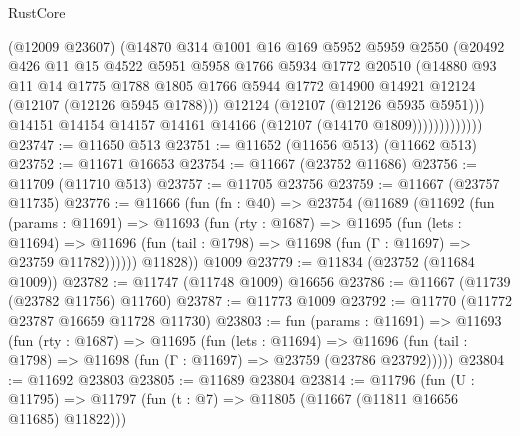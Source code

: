 \begin{lexlean}{RustCore}
\begin{coremodule}
                        (@12009 @23607)
                        (@14870
                          @314
                          @1001
                          @16
                          @169
                          @5952
                          @5959
                          @2550
                          (@20492
                            @426
                            @11
                            @15
                            @4522
                            @5951
                            @5958
                            @1766
                            @5934
                            @1772
                            @20510
                            (@14880
                              @93
                              @11
                              @14
                              @1775
                              @1788
                              @1805
                              @1766
                              @5944
                              @1772
                              @14900
                              @14921
                              @12124
                              (@12107 (@12126 @5945 @1788)))
                            @12124
                            (@12107 (@12126 @5935 @5951)))
                          @14151
                          @14154
                          @14157
                          @14161
                          @14166
                          (@12107 (@14170 @1809)))))))))))))
@23747 := @11650 @513
@23751 := @11652 (@11656 @513) (@11662 @513)
@23752 := @11671 @16653
@23754 := @11667 (@23752 @11686)
@23756 := @11709 (@11710 @513)
@23757 := @11705 @23756
@23759 := @11667 (@23757 @11735)
@23776 := @11666
    (fun (fn : @40) =>
    @23754
      (@11689
        (@11692
          (fun (params : @11691) =>
          @11693
            (fun (rty : @1687) =>
            @11695
              (fun (lets : @11694) =>
              @11696 (fun (tail : @1798) => @11698 (fun (Γ : @11697) => @23759 @11782))))))
        @11828))
    @1009
@23779 := @11834 (@23752 (@11684 @1009))
@23782 := @11747 (@11748 @1009) @16656
@23786 := @11667 (@11739 (@23782 @11756) @11760)
@23787 := @11773 @1009
@23792 := @11770 (@11772 @23787 @16659 @11728 @11730)
@23803 := fun (params : @11691) =>
  @11693
    (fun (rty : @1687) =>
    @11695
      (fun (lets : @11694) =>
      @11696 (fun (tail : @1798) => @11698 (fun (Γ : @11697) => @23759 (@23786 @23792)))))
@23804 := @11692 @23803
@23805 := @11689 @23804
@23814 := @11796
    (fun (U : @11795) => @11797 (fun (t : @7) => @11805 (@11667 (@11811 @16656 @11685) @11822)))

\end{coremodule}
\end{lexlean}
